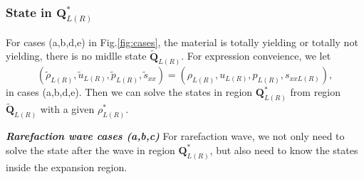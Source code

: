 \documentclass[review]{elsarticle}
\begin{document}
 \subsubsection{State in $\mathbf{Q}_{L(R)}^*$}

 For cases (a,b,d,e) in Fig.\ref{fig:cases}, the material is totally yielding or totally not yielding, there is no midlle state $\tilde{\mathbf{Q}}_{L(R)}$. For  expression conveience, we let    
 \begin{equation}
   (\tilde{\rho}_{L(R)},\tilde{u}_{L(R)},\tilde{p}_{L(R)},\tilde{s}_{xx}) =(\rho_{L(R)}, u_{L(R)},p_{L(R)},s_{xxL(R)}),
\end{equation}
in cases (a,b,d,e). Then we can solve the states in region $\mathbf{Q}_{L(R)}^*$ from region  $\tilde{\mathbf{Q}}_{L(R)}$ with a given $\rho^*_{L(R)}$.     

\emph{\textbf{Rarefaction wave cases (a,b,c)}} For rarefaction wave, 
we not only  need to solve the state after the wave in region $\mathbf{Q}_{L(R)}^*$, but also  need to know the states inside the expansion region. 
\end{document}
